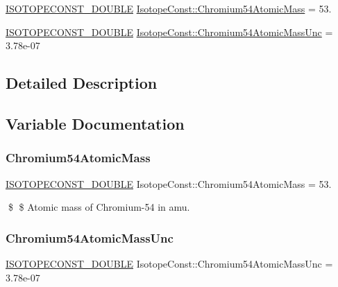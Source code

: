 \begin{DoxyCompactItemize}
\item 
\mbox{\hyperlink{group___isotope_const-_macros_ga8f45a7272ce02c0b4c65c44636ed719a}{I\+S\+O\+T\+O\+P\+E\+C\+O\+N\+S\+T\+\_\+\+D\+O\+U\+B\+LE}} \mbox{\hyperlink{group___isotope_const-_chromium-_cr54_ga0e3d8dbfe4f867811858dd31bbbf1a6c}{Isotope\+Const\+::\+Chromium54\+Atomic\+Mass}} = 53.
\item 
\mbox{\hyperlink{group___isotope_const-_macros_ga8f45a7272ce02c0b4c65c44636ed719a}{I\+S\+O\+T\+O\+P\+E\+C\+O\+N\+S\+T\+\_\+\+D\+O\+U\+B\+LE}} \mbox{\hyperlink{group___isotope_const-_chromium-_cr54_ga1c485d30005f7b68749bf167eceff337}{Isotope\+Const\+::\+Chromium54\+Atomic\+Mass\+Unc}} = 3.\+78e-\/07
\end{DoxyCompactItemize}


\subsection{Detailed Description}


\subsection{Variable Documentation}
\mbox{\label{group___isotope_const-_chromium-_cr54_ga0e3d8dbfe4f867811858dd31bbbf1a6c}} 
\subsubsection{\texorpdfstring{Chromium54\+Atomic\+Mass}{Chromium54AtomicMass}}
{\footnotesize\ttfamily \mbox{\hyperlink{group___isotope_const-_macros_ga8f45a7272ce02c0b4c65c44636ed719a}{I\+S\+O\+T\+O\+P\+E\+C\+O\+N\+S\+T\+\_\+\+D\+O\+U\+B\+LE}} Isotope\+Const\+::\+Chromium54\+Atomic\+Mass = 53.}

\$ \$ Atomic mass of Chromium-\/54 in amu. \mbox{\label{group___isotope_const-_chromium-_cr54_ga1c485d30005f7b68749bf167eceff337}} 
\subsubsection{\texorpdfstring{Chromium54\+Atomic\+Mass\+Unc}{Chromium54AtomicMassUnc}}
{\footnotesize\ttfamily \mbox{\hyperlink{group___isotope_const-_macros_ga8f45a7272ce02c0b4c65c44636ed719a}{I\+S\+O\+T\+O\+P\+E\+C\+O\+N\+S\+T\+\_\+\+D\+O\+U\+B\+LE}} Isotope\+Const\+::\+Chromium54\+Atomic\+Mass\+Unc = 3.\+78e-\/07}

